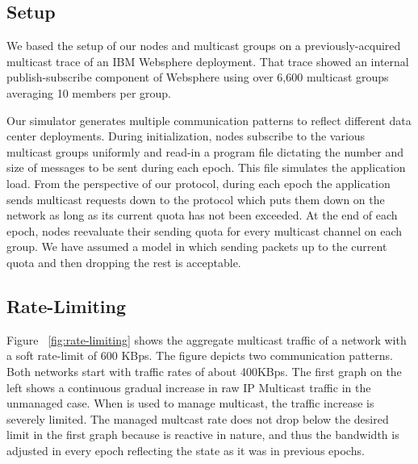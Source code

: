 \subsection{Setup}
We based the setup of our nodes and multicast groups on a previously-acquired multicast trace of an IBM Websphere \cite{websphere} deployment. That trace showed an internal publish-subscribe component of Websphere using over 6,600 multicast groups averaging 10 members per group.

Our simulator generates multiple communication patterns to reflect different data center deployments. During initialization, nodes subscribe to the various multicast groups uniformly and read-in a program file dictating the number and size of messages to be sent during each epoch. This file simulates the application load. From the perspective of our protocol, during each epoch the application sends multicast requests down to the protocol which puts them down on the network as long as its current quota has not been exceeded. At the end of each epoch, nodes reevaluate their sending quota for every multicast channel on each group. We have assumed a model in which sending packets up to the current quota and then dropping the rest is acceptable.

\subsection{Rate-Limiting}
Figure ~\ref{fig:rate-limiting} shows the aggregate multicast traffic of a network with a soft rate-limit of 600 KBps. The figure depicts two communication patterns. Both networks start with traffic rates of about 400KBps. The first graph on the left shows a continuous gradual increase in raw IP Multicast traffic in the unmanaged case. When \sysname{} is used to manage multicast, the traffic increase is severely limited. The managed multcast rate does not drop below the desired limit in the first graph because \sysname{} is reactive in nature, and thus the bandwidth is adjusted in every epoch reflecting the state as it was in previous epochs.


